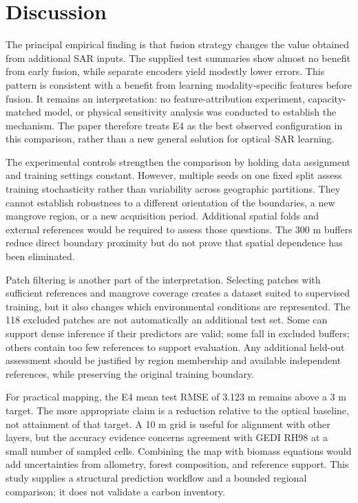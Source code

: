 \section{Discussion}

The principal empirical finding is that fusion strategy changes the value obtained from additional SAR inputs. The supplied test summaries show almost no benefit from early fusion, while separate encoders yield modestly lower errors. This pattern is consistent with a benefit from learning modality-specific features before fusion. It remains an interpretation: no feature-attribution experiment, capacity-matched model, or physical sensitivity analysis was conducted to establish the mechanism. The paper therefore treats E4 as the best observed configuration in this comparison, rather than a new general solution for optical--SAR learning.

The experimental controls strengthen the comparison by holding data assignment and training settings constant. However, multiple seeds on one fixed split assess training stochasticity rather than variability across geographic partitions. They cannot establish robustness to a different orientation of the boundaries, a new mangrove region, or a new acquisition period. Additional spatial folds and external references would be required to assess those questions. The 300 m buffers reduce direct boundary proximity but do not prove that spatial dependence has been eliminated.

Patch filtering is another part of the interpretation. Selecting patches with sufficient references and mangrove coverage creates a dataset suited to supervised training, but it also changes which environmental conditions are represented. The 118 excluded patches are not automatically an additional test set. Some can support dense inference if their predictors are valid; some fall in excluded buffers; others contain too few references to support evaluation. Any additional held-out assessment should be justified by region membership and available independent references, while preserving the original training boundary.

For practical mapping, the E4 mean test RMSE of 3.123 m remains above a 3 m target. The more appropriate claim is a reduction relative to the optical baseline, not attainment of that target. A 10 m grid is useful for alignment with other layers, but the accuracy evidence concerns agreement with GEDI RH98 at a small number of sampled cells. Combining the map with biomass equations would add uncertainties from allometry, forest composition, and reference support. This study supplies a structural prediction workflow and a bounded regional comparison; it does not validate a carbon inventory.
